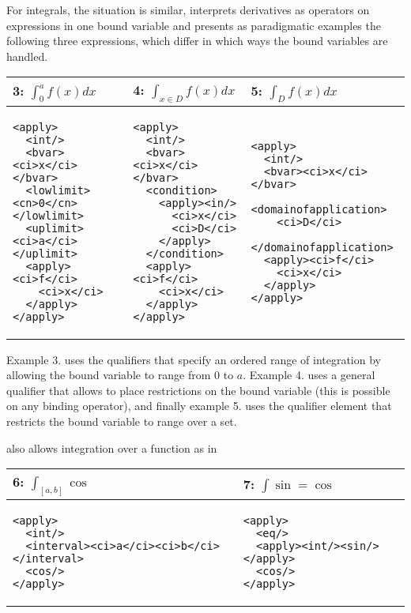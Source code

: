 \documentclass[12pt]{article}
\begin{document}
For integrals, the situation is similar, {\mathml} interprets derivatives as operators on
expressions in one bound variable and presents as paradigmatic examples the following
three expressions, which differ in which ways the bound variables are handled.
\begin{center}\lstset{frame=none,numbers=none,lineskip=-.7ex,aboveskip=-.5em,belowskip=-1em,language=MathML}
\begin{tabular}{|p{5.9cm}|p{4.4cm}|p{4.4cm}|}\hline
  3: $\int_0^af(x) dx$ & 4: $\int_{x\in D}f(x) dx$ & 5: $\int_Df(x)dx$\\\hline
\begin{lstlisting}
<apply>
  <int/>
  <bvar><ci>x</ci></bvar>
  <lowlimit><cn>0</cn></lowlimit>
  <uplimit><ci>a</ci></uplimit>
  <apply><ci>f</ci>
    <ci>x</ci>
  </apply>
</apply>
\end{lstlisting}
&
\begin{lstlisting}[language=MathML]
<apply>
  <int/>
  <bvar><ci>x</ci></bvar>
  <condition>
    <apply><in/>
      <ci>x</ci>
      <ci>D</ci>
    </apply>
  </condition>
  <apply><ci>f</ci>
    <ci>x</ci>
  </apply>
</apply>
\end{lstlisting}
&
\begin{lstlisting}[language=MathML]
<apply>
  <int/>
  <bvar><ci>x</ci></bvar>
  <domainofapplication>
    <ci>D</ci>
  </domainofapplication>
  <apply><ci>f</ci>
    <ci>x</ci>
  </apply>
</apply>
\end{lstlisting}
\\\hline
\end{tabular}
\end{center}
Example 3. uses the {} {} qualifiers that specify an
ordered range of integration by allowing the bound variable to range from 0 to
$a$. Example 4. uses a general {} qualifier that allows to place
restrictions on the bound variable (this is possible on any binding operator), and finally
example 5. uses the {} qualifier element that restricts the
bound variable to range over a set. 

{} also allows integration over a function as in
\begin{center}\lstset{frame=none,numbers=none,lineskip=-.7ex,aboveskip=-.5em,belowskip=-1em,language=MathML}
\begin{tabular}{|p{7.7cm}|p{5.3cm}|}\hline
  6: $\int_{[a,b]}\cos$ & 7: $\int\sin=\cos$\\\hline
\begin{lstlisting}
<apply>
  <int/>
  <interval><ci>a</ci><ci>b</ci></interval>
  <cos/>
</apply>
\end{lstlisting}
&
\begin{lstlisting}
<apply>
  <eq/>
  <apply><int/><sin/></apply>
  <cos/>
</apply>
\end{lstlisting}
\\\hline
\end{tabular}
\end{center}
\end{document}
